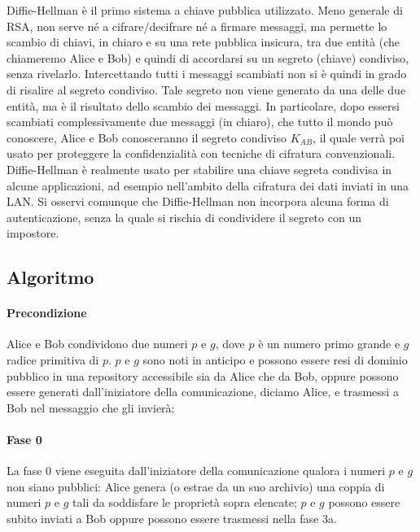 Diffie-Hellman è il primo sistema a chiave pubblica utilizzato. Meno generale di RSA, non serve né a cifrare/decifrare né a firmare messaggi, ma permette lo scambio di chiavi, in chiaro e su una rete pubblica insicura, tra due entità (che chiameremo Alice e Bob) e quindi di accordarsi su un segreto (chiave) condiviso, senza rivelarlo. Intercettando tutti i messaggi scambiati non si è quindi in grado di risalire al segreto condiviso. Tale segreto non viene generato da una delle due entità, ma è il risultato dello scambio dei messaggi. In particolare, dopo essersi scambiati complessivamente due messaggi (in chiaro), che tutto il mondo può conoscere, Alice e Bob conosceranno il segreto condiviso $K_{AB}$, il quale verrà poi usato per proteggere la confidenzialità con tecniche di cifratura convenzionali.
\newline \newline
Diffie-Hellman è realmente usato per stabilire una chiave segreta condivisa in alcune applicazioni, ad esempio nell'ambito della cifratura dei dati inviati in una LAN. Si osservi comunque che Diffie-Hellman non incorpora alcuna forma di autenticazione, senza la quale si rischia di condividere il segreto con un impostore.  

\subsection{Algoritmo} 
\paragraph{Precondizione}
Alice e Bob condividono due numeri $p$ e $g$, dove $p$ è un numero primo grande e $g$ radice primitiva di $p$. $p$ e $g$ sono noti in anticipo e possono essere resi di dominio pubblico in una repository accessibile sia da Alice che da Bob, oppure possono essere generati dall'iniziatore della comunicazione, diciamo Alice, e trasmessi a Bob nel messaggio che gli invierà;
\paragraph{Fase 0}
La fase 0 viene eseguita dall'iniziatore della comunicazione qualora i numeri $p$ e $g$ non siano pubblici: Alice genera (o estrae da un suo archivio) una coppia di numeri $p$ e $g$ tali da soddisfare le proprietà sopra elencate; $p$ e $g$ possono essere subito inviati a Bob oppure possono essere trasmessi nella fase 3a.
